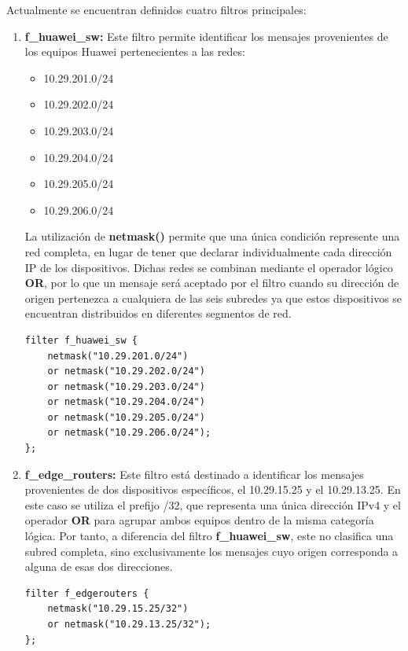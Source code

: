 Actualmente se encuentran definidos cuatro filtros principales:

\begin{enumerate}
    \item \textbf{f\_huawei\_sw:} Este filtro permite identificar los mensajes provenientes de los equipos Huawei pertenecientes a las redes:
    \begin{itemize}
        \item 10.29.201.0/24
        \item 10.29.202.0/24
        \item 10.29.203.0/24
        \item 10.29.204.0/24
        \item 10.29.205.0/24
        \item 10.29.206.0/24
    \end{itemize}

    La utilización de \textbf{netmask()} permite que una única condición represente una red completa, en lugar de tener que declarar individualmente cada dirección IP de los dispositivos. Dichas redes se combinan mediante el operador lógico \textbf{OR}, por lo que un mensaje será aceptado por el filtro cuando su dirección de origen pertenezca a cualquiera de las seis subredes ya que estos dispositivos se encuentran distribuidos en diferentes segmentos de red.

\begin{lstlisting}[style=logstyle]
filter f_huawei_sw {
    netmask("10.29.201.0/24")
    or netmask("10.29.202.0/24")
    or netmask("10.29.203.0/24")
    or netmask("10.29.204.0/24")
    or netmask("10.29.205.0/24")
    or netmask("10.29.206.0/24");
};
\end{lstlisting}

    \item \textbf{f\_edge\_routers:} Este filtro está destinado a identificar los mensajes provenientes de dos dispositivos específicos, el 10.29.15.25 y el 10.29.13.25. En este caso se utiliza el prefijo /32, que representa una única dirección IPv4 y el operador \textbf{OR} para agrupar ambos equipos dentro de la misma categoría lógica. Por tanto, a diferencia del filtro \textbf{f\_huawei\_sw}, este no clasifica una subred completa, sino exclusivamente los mensajes cuyo origen corresponda a alguna de esas dos direcciones.

\begin{lstlisting}[style=logstyle]
filter f_edgerouters {
    netmask("10.29.15.25/32")
    or netmask("10.29.13.25/32");
};
\end{lstlisting}


\end{enumerate}
